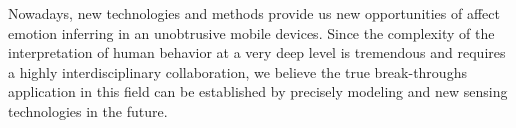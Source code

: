 Nowadays, new technologies and methods provide us new opportunities of affect emotion inferring in an unobtrusive mobile devices. Since the complexity of the interpretation of human behavior at a very deep level is tremendous and requires a highly interdisciplinary collaboration, we believe the true break-throughs application in this field can be established by precisely modeling and new sensing technologies in the future.